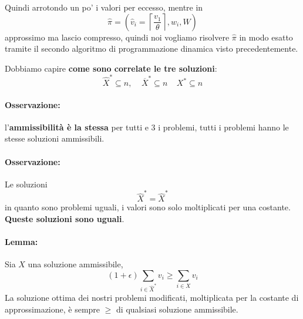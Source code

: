 \documentclass[11pt]{article}
\begin{document}
	Quindi arrotondo un po' i valori per eccesso, mentre in 
	$$ \hat \pi = \left( \hat v_i = \left\lceil \frac{v_1}{\theta} \right\rceil, w_i, W \right)$$
	approssimo ma lascio compresso, quindi noi vogliamo risolvere $\hat \pi$ in modo esatto tramite il secondo algoritmo di programmazione dinamica visto precedentemente.\\
	
	\newpage
	
	Dobbiamo capire \textbf{come sono correlate le tre soluzioni}:
	$$ \hat X^\ast \subseteq n, \;\;\;\; \overline X^\ast \subseteq n \;\;\;\; X^\ast \subseteq n$$
	
	\paragraph{Osservazione:} l'\textbf{ammissibilità è la stessa} per tutti e 3 i problemi, tutti i problemi hanno le stesse soluzioni ammissibili.\\
	
	\paragraph{Osservazione:} Le soluzioni 
	$$ \hat X^\ast = \hat X^\ast$$
	in quanto sono problemi uguali, i valori sono solo moltiplicati per una costante. \textbf{Queste soluzioni sono uguali}.\\
	
	\paragraph{Lemma:} Sia $X$ una soluzione ammissibile, 
	$$ (1 + \epsilon) \sum_{i \in \hat X^\ast} v_i \geq \sum_{i \in X} v_i $$
	La soluzione ottima dei nostri problemi modificati, moltiplicata per la costante di approssimazione, è sempre $\geq$ di qualsiasi soluzione ammissibile.\\
	
\end{document}
